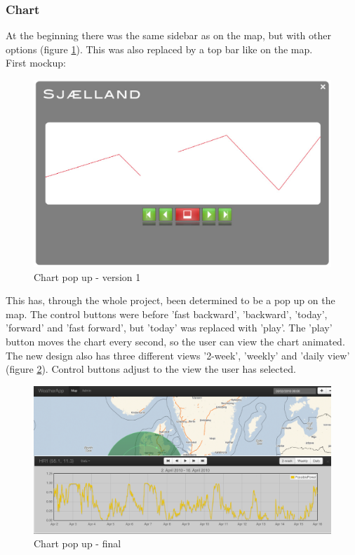 \subsubsection{Chart}
At the beginning there was the same sidebar as on the map, but with other options (figure \ref{fig:chart_v1}). This was also replaced by a top bar like on the map.\\
First mockup: 
\begin{figure}[htbp]
   \centering
   \includegraphics[width=1\linewidth]{figure/design_chart_v1.eps}
   \caption{Chart pop up - version 1}
   \label{fig:chart_v1}
\end{figure}

This has, through the whole project, been determined to be a pop up on the map.
The control buttons were before 'fast backward', 'backward', 'today', 'forward' and 'fast forward', but 'today' was replaced with 'play'. The 'play' button moves the chart every second, so the user can view the chart animated.\\
The new design also has three different views '2-week', 'weekly' and 'daily view' (figure \ref{fig:chart_final}). Control buttons adjust to the view the user has selected.

\begin{figure}[htbp]
   \centering
   \includegraphics[width=1\linewidth]{figure/design_chart_final.eps}
   \caption{Chart pop up - final}
   \label{fig:chart_final}
\end{figure}



